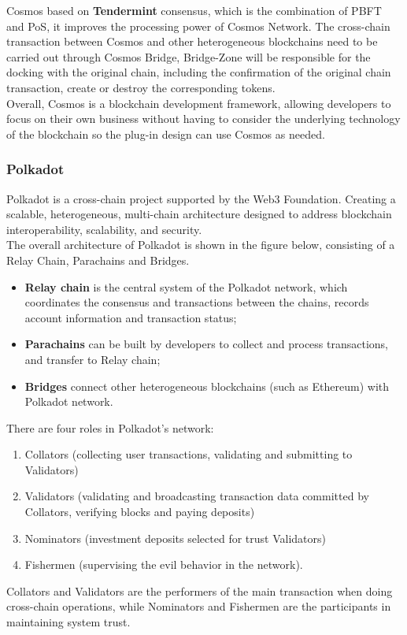 \noindent Cosmos based on \textbf{Tendermint} consensus, which is the combination of PBFT and PoS, it improves the processing power of Cosmos Network. The cross-chain transaction between Cosmos and other heterogeneous blockchains need to be carried out through Cosmos Bridge, Bridge-Zone will be responsible for the docking with the original chain, including the confirmation of the original chain transaction, create or destroy the corresponding tokens.\\
\noindent Overall, Cosmos is a blockchain development framework, allowing developers to focus on their own business without having to consider the underlying technology of the blockchain so the plug-in design can use Cosmos as needed.


\subsubsection{Polkadot}
\noindent Polkadot\cite{polkadot} is a cross-chain project supported by the Web3 Foundation. Creating a scalable, heterogeneous, multi-chain architecture designed to address blockchain interoperability, scalability, and security.\\
\noindent The overall architecture of Polkadot is shown in the figure below, consisting of a Relay Chain, Parachains and Bridges. 

\begin{itemize}
    \item \textbf{Relay chain} is the central system of the Polkadot network, which coordinates the consensus and transactions between the chains, records account information and transaction status; 
    \item \textbf{Parachains} can be built by developers to collect and process transactions, and transfer to Relay chain;
    \item \textbf{Bridges} connect other heterogeneous blockchains (such as Ethereum) with Polkadot network.
\end{itemize} 
\noindent There are four roles in Polkadot's network:
\begin{enumerate}
    \item Collators (collecting user transactions, validating and submitting to Validators)
    \item Validators (validating and broadcasting transaction data committed by Collators, verifying blocks and paying deposits)
    \item Nominators (investment deposits selected for trust Validators)
    \item Fishermen (supervising the evil behavior in the network). 
\end{enumerate}
\noindent Collators and Validators are the performers of the main transaction when doing cross-chain operations, while Nominators and Fishermen are the participants in maintaining system trust.\\


